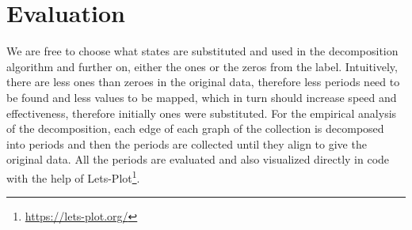 
\chapter{Evaluation}
\label{ch:Evaluation}

We are free to choose what states are substituted and used in the decomposition algorithm and further on, either the ones or the zeros from the label. Intuitively, there are less ones than zeroes in the original data, therefore less periods need to be found and less values to be mapped, which in turn should increase speed and effectiveness, therefore initially ones were substituted. For the empirical analysis of the decomposition, each edge of each graph of the collection is decomposed into periods and then the periods are collected until they align to give the original data. All the periods are evaluated and also visualized directly in code with the help of Lets-Plot\footnote{\url{https://lets-plot.org/}}.

